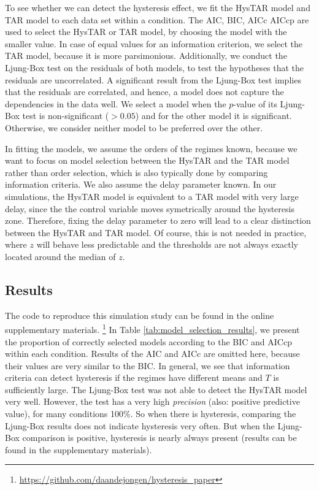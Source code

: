 \documentclass{article}
\begin{document}
To see whether we can detect the hysteresis effect, we fit the HysTAR model and TAR model to each data set within a condition.
The AIC, BIC, AICc AICcp are used to select the HysTAR or TAR model, by choosing the model with the smaller value.
In case of equal values for an information criterion, we select the TAR model, because it is more parsimonious. 
Additionally, we conduct the Ljung-Box test on the residuals of both models, to test the hypotheses that the residuals are uncorrelated.
A significant result from the Ljung-Box test implies that the residuals are correlated, and hence, a model does not capture the dependencies in the data well.
We select a model when the $p$-value of its Ljung-Box test is non-significant ($>0.05$) and for the other model it is significant. Otherwise, we consider neither model to be preferred over the other.

In fitting the models, we assume the orders of the regimes known, because we want to focus on model selection between the HysTAR and the TAR model rather than order selection, which is also typically done by comparing information criteria.
We also assume the delay parameter known. 
In our simulations, the HysTAR model is equivalent to a TAR model with very large delay, since the the control variable moves symetrically around the hysteresis zone.
Therefore, fixing the delay parameter to zero will lead to a clear distinction between the HysTAR and TAR model.
Of course, this is not needed in practice, where $z$ will behave less predictable and the thresholds are not always exactly located around the median of $z$.

\subsection{Results}
\label{sec:model_selection_results}
The code to reproduce this simulation study can be found in the online supplementary materials.
\footnote{\url{https://github.com/daandejongen/hysteresis_paper}}
In Table \ref{tab:model_selection_results}, we present the proportion of correctly selected models according to the BIC and AICcp within each condition. Results of the AIC and AICc are omitted here, because their values are very similar to the BIC. In general, we see that information criteria can detect hysteresis if the regimes have different means and $T$ is sufficiently large.
The Ljung-Box test was not able to detect the HysTAR model very well. However, the test has a very high \textit{precision} (also: positive predictive value), for many conditions 100\%. So when there is hysteresis, comparing the Ljung-Box results does not indicate hysteresis very often. But when the Ljung-Box comparison is positive, hysteresis is nearly always present (results can be found in the supplementary materials).
\end{document}
